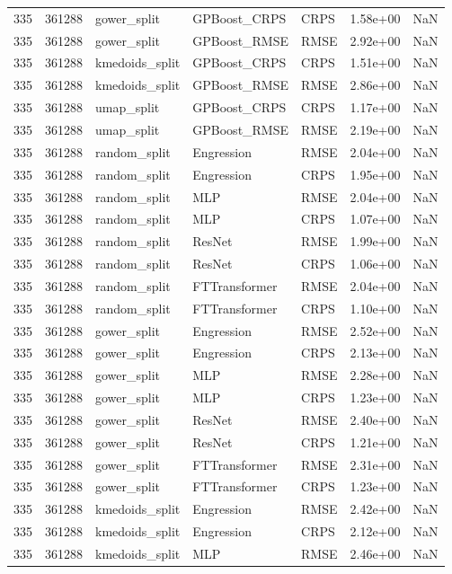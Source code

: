 \begin{tabular}{rrlllrr}
335 & 361288 & gower\_split & GPBoost\_CRPS & CRPS & 1.58e+00 & NaN \\
335 & 361288 & gower\_split & GPBoost\_RMSE & RMSE & 2.92e+00 & NaN \\
335 & 361288 & kmedoids\_split & GPBoost\_CRPS & CRPS & 1.51e+00 & NaN \\
335 & 361288 & kmedoids\_split & GPBoost\_RMSE & RMSE & 2.86e+00 & NaN \\
335 & 361288 & umap\_split & GPBoost\_CRPS & CRPS & 1.17e+00 & NaN \\
335 & 361288 & umap\_split & GPBoost\_RMSE & RMSE & 2.19e+00 & NaN \\
335 & 361288 & random\_split & Engression & RMSE & 2.04e+00 & NaN \\
335 & 361288 & random\_split & Engression & CRPS & 1.95e+00 & NaN \\
335 & 361288 & random\_split & MLP & RMSE & 2.04e+00 & NaN \\
335 & 361288 & random\_split & MLP & CRPS & 1.07e+00 & NaN \\
335 & 361288 & random\_split & ResNet & RMSE & 1.99e+00 & NaN \\
335 & 361288 & random\_split & ResNet & CRPS & 1.06e+00 & NaN \\
335 & 361288 & random\_split & FTTransformer & RMSE & 2.04e+00 & NaN \\
335 & 361288 & random\_split & FTTransformer & CRPS & 1.10e+00 & NaN \\
335 & 361288 & gower\_split & Engression & RMSE & 2.52e+00 & NaN \\
335 & 361288 & gower\_split & Engression & CRPS & 2.13e+00 & NaN \\
335 & 361288 & gower\_split & MLP & RMSE & 2.28e+00 & NaN \\
335 & 361288 & gower\_split & MLP & CRPS & 1.23e+00 & NaN \\
335 & 361288 & gower\_split & ResNet & RMSE & 2.40e+00 & NaN \\
335 & 361288 & gower\_split & ResNet & CRPS & 1.21e+00 & NaN \\
335 & 361288 & gower\_split & FTTransformer & RMSE & 2.31e+00 & NaN \\
335 & 361288 & gower\_split & FTTransformer & CRPS & 1.23e+00 & NaN \\
335 & 361288 & kmedoids\_split & Engression & RMSE & 2.42e+00 & NaN \\
335 & 361288 & kmedoids\_split & Engression & CRPS & 2.12e+00 & NaN \\
335 & 361288 & kmedoids\_split & MLP & RMSE & 2.46e+00 & NaN \\

\end{tabular}
